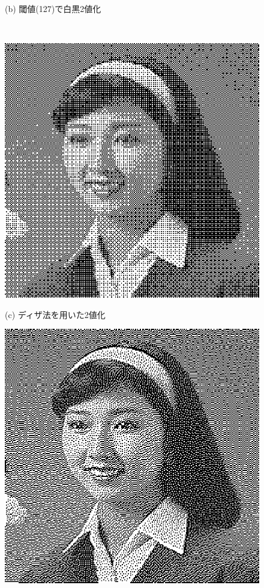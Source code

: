 \begin{figure}[H]
\begin{center}
\begin{minipage}{.38\textwidth}
\begin{center}
(b) 閾値(127)で白黒2値化
\end{center}
\end{minipage}\\[.5\baselineskip]
\begin{minipage}{.38\textwidth}
\begin{center}
\includegraphics[width=.98\textwidth]{fig/hair1_dither.eps}

(c) ディザ法を用いた2値化
\end{center}
\end{minipage}
\begin{minipage}{.38\textwidth}
\begin{center}
\includegraphics[width=.98\textwidth]{fig/hair1_ed.eps}


\end{center}
\end{minipage}
\end{center}
\end{figure}
